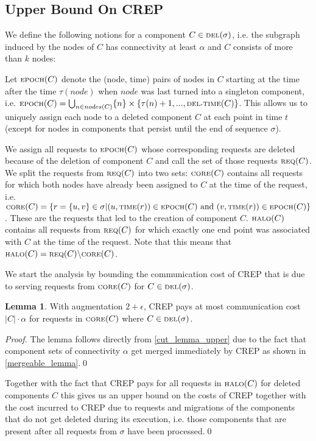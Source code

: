 \documentclass[a4paper,xcolor=dvipsnames, tikz, 12pt]{article}
\newcommand{\nl}{\newline}
\newcommand{\crep}{C{\scriptsize REP}}
\newcommand{\del}{\text{\scriptsize DEL}}
\newcommand{\core}{\text{\scriptsize CORE}}
\newcommand{\halo}{\text{\scriptsize HALO}}
\newcommand{\req}{\text{\scriptsize REQ}}
\newcommand{\epoch}{\text{\scriptsize EPOCH}}
\newcommand{\delTime}{\text{\scriptsize DEL-TIME}}
\newcommand{\reqTime}{\text{\scriptsize TIME}}
\theoremstyle{definition}
\newtheorem{lemma}[defi]{Lemma}
\begin{document}
\subsection{Upper Bound On \crep{}}

We define the following notions for a component $C\in\del{}(\sigma)$, i.e. the subgraph induced by the nodes of $C$ has connectivity at least $\alpha$ and $C$ consists of more than $k$ nodes:

Let $\epoch{}(C)$ denote the (node, time) pairs of nodes in $C$ starting at the time after the time $\tau(node)$ when $node$ was last turned into a singleton component, i.e. $\epoch{}(C)=\bigcup_{n\in nodes(C)}\{n\}\times\{\tau(n)+1,...,\delTime{}(C)\}$. This allows us to uniquely assign each node to a deleted component $C$ at each point in time $t$ (except for nodes in components that persist until the end of sequence $\sigma$).

We assign all requests to $\epoch(C)$ whose corresponding requests are deleted because of the deletion of component $C$ and call the set of those requests $\req(C)$.
We split the requests from $\req{}(C)$ into two sets: $\core(C)$ contains all requests for which both nodes have already been assigned to $C$ at the time of the request, i.e. $\core(C)=\{r=\{u,v\}\in\sigma| (u,\reqTime(r))\in \epoch(C)\text{ and } (v, \reqTime(r))\in \epoch(C)\}$. These are the requests that led to the creation of component $C$. 
$\halo(C)$ contains all requests from $\req(C)$ for which exactly one end point was associated with $C$ at the time of the request. Note that this means that $\halo(C)=\req(C)\backslash \core(C)$.

We start the analysis by bounding the communication cost of \crep{} that is due to serving requests from $\core(C)$ for $C\in\del{}(\sigma)$.

\begin{lemma}
	\label{core_comm_upper}
	With augmentation $2+\epsilon$, \crep{} pays at most communication cost $|C|\cdot\alpha$ for requests in $\core(C)$ where $C\in\del{}(\sigma)$.
\end{lemma}

\textit{Proof.} The lemma follows directly from \cref{cut_lemma_upper} due to the fact that component sets of connectivity $\alpha$ get merged immediately by \crep{} as shown in \cref{mergeable_lemma}.\qed\nl

Together with the fact that \crep{} pays for all requests in $\halo(C)$ for deleted components $C$ this gives us  an upper bound on the costs of \crep{} together with the cost incurred to \crep{} due to requests and migrations of the components that do not get deleted during its execution, i.e. those components that are present after all requests from $\sigma$ have been processed.\qed\nl
\end{document}

